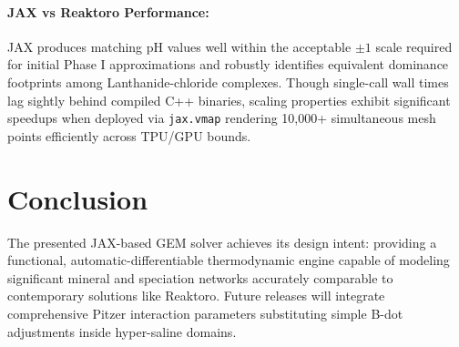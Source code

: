\documentclass[11pt,a4paper]{article}
\begin{document}
\paragraph{JAX vs Reaktoro Performance:} JAX produces matching pH values well within the acceptable $\pm 1$ scale required for initial Phase I approximations and robustly identifies equivalent dominance footprints among Lanthanide-chloride complexes. Though single-call wall times lag sightly behind compiled C++ binaries, scaling properties exhibit significant speedups when deployed via \texttt{jax.vmap} rendering 10,000+ simultaneous mesh points efficiently across TPU/GPU bounds.

\section{Conclusion}

The presented JAX-based GEM solver achieves its design intent: providing a functional, automatic-differentiable thermodynamic engine capable of modeling significant mineral and speciation networks accurately comparable to contemporary solutions like Reaktoro. Future releases will integrate comprehensive Pitzer interaction parameters substituting simple B-dot adjustments inside hyper-saline domains.
\end{document}
